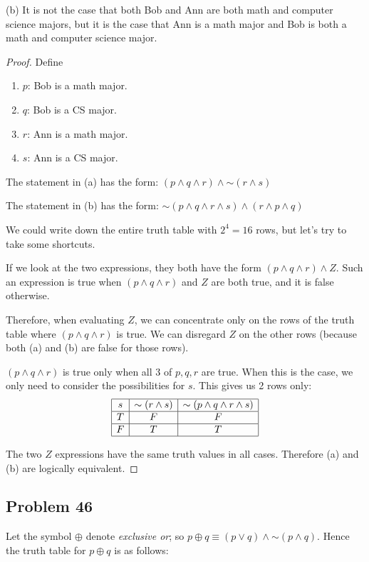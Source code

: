 \documentclass[14pt]{extarticle}
\begin{document}
(b)
It is not the case that both Bob and Ann are both math and computer science
majors, but it is the case that Ann is a math major and Bob is both a math and
computer science major.

\begin{proof}
Define
\begin{enumerate}
\item $p$: Bob is a math major.
\item $q$: Bob is a CS major.
\item $r$: Ann is a math major.
\item $s$: Ann is a CS major.
\end{enumerate}

The statement in (a) has the form:
$(p \wedge q \wedge r) \wedge {\sim (r \wedge s)}$

The statement in (b) has the form:
${\sim (p \wedge q \wedge r \wedge s)} \wedge (r \wedge p \wedge q)$

We could write down the entire truth table with $2^4 = 16$ rows, but let's try
to take some shortcuts.

If we look at the two expressions, they both have the form
$(p \wedge q \wedge r) \wedge Z$. Such an expression is true when $(p \wedge q
\wedge r)$ and $Z$ are both true, and it is false otherwise.

Therefore, when evaluating $Z$, we can concentrate only on the rows of the truth
table where $(p \wedge q \wedge r)$ is true. We can disregard $Z$ on the other
rows (because both (a) and (b) are false for those rows).

$(p \wedge q \wedge r)$ is true only when all 3 of $p, q, r$ are true. When this
is the case, we only need to consider the possibilities for $s$. This gives us 2
rows only:
$$
\begin{array}{|c|c|c|}
\hline
s & {\sim (r \wedge s)} & {\sim (p \wedge q \wedge r \wedge s)} \\
\hline
T & F & F \\
\hline
F & T & T \\
\hline
\end{array}
$$

The two $Z$ expressions have the same truth values in all cases. Therefore (a)
and (b) are logically equivalent.
\end{proof}

\subsection{Problem 46}
Let the symbol $\oplus$ denote {\it exclusive or}; so $p \oplus q \equiv (p \vee
q) \wedge {\sim(p \wedge q)}$. Hence the truth table for $p \oplus q$ is as
follows:
\end{document}
